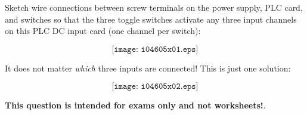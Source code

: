 

Sketch wire connections between screw terminals on the power supply, PLC card, and switches so that the three toggle switches activate any three input channels on this PLC DC input card (one channel per switch):

$$\texttt{[image: i04605x01.eps]}$$







It does not matter {\it which} three inputs are connected!  This is just one solution:

$$\texttt{[image: i04605x02.eps]}$$







{\bf This question is intended for exams only and not worksheets!}.


